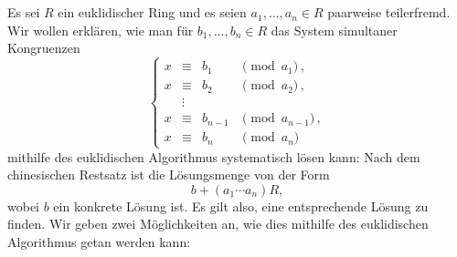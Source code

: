 \section{}

Es sei $R$ ein euklidischer Ring und es seien $a_1, \dotsc, a_n \in R$ paarweise teilerfremd.
Wir wollen erklären, wie man für $b_1, \dotsc, b_n \in R$ das System simultaner Kongruenzen
\[
  \left\{
    \begin{array}{rcll}
      x &\equiv& b_1      & \pmod{a_1}      \,, \\
      x &\equiv& b_2      & \pmod{a_2}      \,, \\
        &\vdots&          &                     \\
      x &\equiv& b_{n-1}  & \pmod{a_{n-1}}  \,, \\
      x &\equiv& b_n      & \pmod{a_n}
    \end{array}
  \right.
\]
mithilfe des euklidischen Algorithmus systematisch lösen kann:
Nach dem chinesischen Restsatz ist die Lösungsmenge von der Form
\[
  b + (a_1 \dotsm a_n) R,
\]
wobei $b$ ein konkrete Lösung ist.
Es gilt also, eine entsprechende Lösung zu finden.
Wir geben zwei Möglichkeiten an, wie dies mithilfe des euklidischen Algorithmus getan werden kann:
